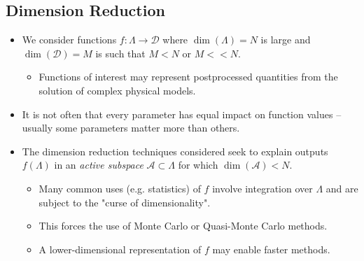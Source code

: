 \documentclass[11pt]{beamer}
\newcommand{\A}{\mathcal{A}}
\begin{document}
\subsection{Dimension Reduction}

\begin{frame}

\begin{itemize}

	\item We consider functions $f: \Lambda \to \mathcal{D}$ where $\dim(\Lambda)=N$ is large and $\dim(\mathcal{D})=M$ is such that $M<N$ or $M<<N$.

\begin{itemize}
		\item Functions of interest may represent postprocessed quantities from the solution of complex physical models.
\end{itemize}

\item It is not often that every parameter has equal impact on function values -- usually some parameters matter more than others.

\item The dimension reduction techniques considered seek to explain outputs $f(\Lambda)$ in an \textit{active subspace} $\mathcal{A} \subset \Lambda$ for which $\dim(\A)<N.$

\begin{itemize}
\item Many common uses (e.g. statistics) of $f$ involve integration over $\Lambda$ and are subject to the "curse of dimensionality".
\item This forces the use of Monte Carlo or Quasi-Monte Carlo methods.
\item A lower-dimensional representation of $f$ may enable faster methods.
\end{itemize}


\end{itemize}


\end{frame}
\end{document}
